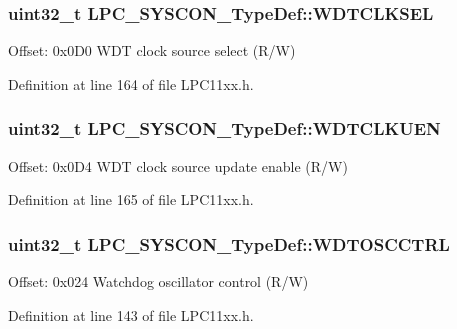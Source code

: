 \subsubsection[{\texorpdfstring{W\+D\+T\+C\+L\+K\+S\+EL}{WDTCLKSEL}}]{ uint32\+\_\+t L\+P\+C\+\_\+\+S\+Y\+S\+C\+O\+N\+\_\+\+Type\+Def\+::\+W\+D\+T\+C\+L\+K\+S\+EL}\hypertarget{group___l_p_c11xx___definitions_gafcb4b4060b3fb896d8932b4709982186}{}\label{group___l_p_c11xx___definitions_gafcb4b4060b3fb896d8932b4709982186}
Offset\+: 0x0\+D0 W\+DT clock source select (R/W) 

Definition at line 164 of file L\+P\+C11xx.\+h.

\subsubsection[{\texorpdfstring{W\+D\+T\+C\+L\+K\+U\+EN}{WDTCLKUEN}}]{ uint32\+\_\+t L\+P\+C\+\_\+\+S\+Y\+S\+C\+O\+N\+\_\+\+Type\+Def\+::\+W\+D\+T\+C\+L\+K\+U\+EN}\hypertarget{group___l_p_c11xx___definitions_gafed9dd241501cd76e1f45ef74324a8c6}{}\label{group___l_p_c11xx___definitions_gafed9dd241501cd76e1f45ef74324a8c6}
Offset\+: 0x0\+D4 W\+DT clock source update enable (R/W) 

Definition at line 165 of file L\+P\+C11xx.\+h.

\subsubsection[{\texorpdfstring{W\+D\+T\+O\+S\+C\+C\+T\+RL}{WDTOSCCTRL}}]{ uint32\+\_\+t L\+P\+C\+\_\+\+S\+Y\+S\+C\+O\+N\+\_\+\+Type\+Def\+::\+W\+D\+T\+O\+S\+C\+C\+T\+RL}\hypertarget{group___l_p_c11xx___definitions_ga3ca10fa6e4f236c2f1a9dd0a801f81b3}{}\label{group___l_p_c11xx___definitions_ga3ca10fa6e4f236c2f1a9dd0a801f81b3}
Offset\+: 0x024 Watchdog oscillator control (R/W) 

Definition at line 143 of file L\+P\+C11xx.\+h.

